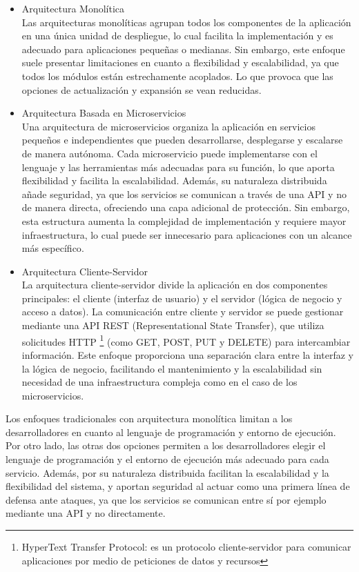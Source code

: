 \begin{itemize}
\item Arquitectura Monolítica\\
Las arquitecturas monolíticas agrupan todos los componentes de la aplicación en una única unidad de despliegue, lo cual facilita la implementación y es adecuado para aplicaciones pequeñas o medianas. Sin embargo, este enfoque suele presentar limitaciones en cuanto a flexibilidad y escalabilidad, ya que todos los módulos están estrechamente acoplados. Lo que provoca que las opciones de actualización y expansión se vean reducidas.

\item Arquitectura Basada en Microservicios\\
Una arquitectura de microservicios organiza la aplicación en servicios pequeños e independientes que pueden desarrollarse, desplegarse y escalarse de manera autónoma. Cada microservicio puede implementarse con el lenguaje y las herramientas más adecuadas para su función, lo que aporta flexibilidad y facilita la escalabilidad. Además, su naturaleza distribuida añade seguridad, ya que los servicios se comunican a través de una API y no de manera directa, ofreciendo una capa adicional de protección. Sin embargo, esta estructura aumenta la complejidad de implementación y requiere mayor infraestructura, lo cual puede ser innecesario para aplicaciones con un alcance más específico\cite{RedHat2023}\cite{lopez2017arquitectura}.

\item Arquitectura Cliente-Servidor\\
La arquitectura cliente-servidor divide la aplicación en dos componentes principales: el cliente (interfaz de usuario) y el servidor (lógica de negocio y acceso a datos). La comunicación entre cliente y servidor se puede gestionar mediante una API REST (Representational State Transfer), que utiliza solicitudes HTTP \footnote{HyperText Transfer Protocol: es un protocolo cliente-servidor para comunicar aplicaciones por medio de peticiones de datos y recursos} (como GET, POST, PUT y DELETE) para intercambiar información. Este enfoque proporciona una separación clara entre la interfaz y la lógica de negocio, facilitando el mantenimiento y la escalabilidad sin necesidad de una infraestructura compleja como en el caso de los microservicios.

\end{itemize}

Los enfoques tradicionales con arquitectura monolítica limitan a los desarrolladores en cuanto al lenguaje de programación y entorno de ejecución. Por otro lado, las otras dos opciones permiten a los desarrolladores elegir el lenguaje de programación y el entorno de ejecución más adecuado para cada servicio. Además, por su naturaleza distribuida facilitan la escalabilidad y la flexibilidad del sistema, y aportan seguridad al actuar como una primera línea de defensa ante ataques, ya que los servicios se comunican entre sí por ejemplo mediante una API y no directamente. 

